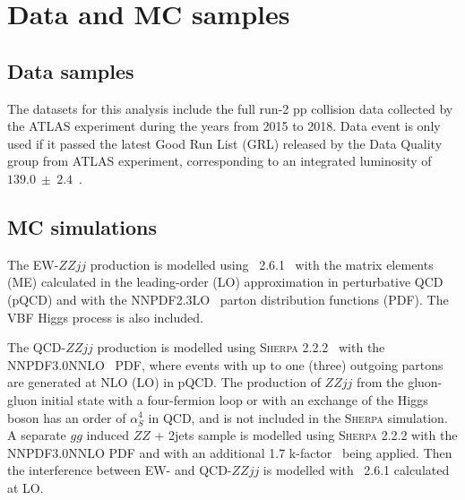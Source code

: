 \section{Data and MC samples}

\subsection{Data samples}
\label{sec:vbszz_data}

The datasets for this analysis include the full run-2 pp collision data collected by the ATLAS experiment during the years from 2015 to 2018.
Data event is only used if it passed the latest Good Run List (GRL) released by the Data Quality group from ATLAS experiment,
corresponding to an integrated luminosity of $139.0~\pm~2.4$~\ifb.



\subsection{MC simulations}
\label{sec:mc}

The EW-$ZZjj$ production is modelled using \MGMCatNLO~2.6.1~\cite{Alwall:2014hca} with the matrix elements (ME) calculated in the leading-order (LO) approximation
in perturbative QCD (pQCD) and with the NNPDF2.3LO~\cite{Ball:2012cx} parton distribution functions (PDF).
The VBF Higgs process is also included.

The QCD-$ZZjj$ production is modelled using \textsc{Sherpa} 2.2.2~\cite{Gleisberg:2008ta} with the NNPDF3.0NNLO~\cite{ball2015parton} PDF,
where events with up to one (three) outgoing partons are generated at NLO (LO) in pQCD.
The production of $ZZjj$ from the gluon-gluon initial state with a four-fermion loop or with an exchange of the Higgs boson has an order of $\alpha_{S}^{4}$ in QCD,
and is not included in the \textsc{Sherpa} simulation.
A separate $gg$ induced $ZZ$ + 2jets sample is modelled using \textsc{Sherpa} 2.2.2 with the NNPDF3.0NNLO PDF
and with an additional 1.7 k-factor~\cite{PhysRevD.92.094028} being applied.
Then the interference between EW- and QCD-$ZZjj$ is modelled with \MGMCatNLO~2.6.1 calculated at LO.

